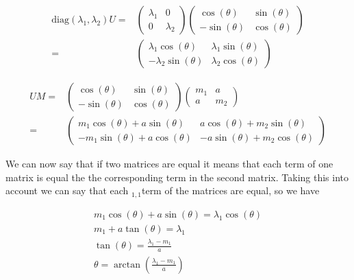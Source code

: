\documentclass[11pt,letterpaper]{article}%
\begin{document}
\begin{enumerate}[label=\Large{\textbf{\arabic*.}}]
{{\begin{enumerate}[label=\textit{\roman*.}]
\begin{equation}
\label{side1}
\begin{split}
\text{diag}(\lambda_1,\lambda_2)U =&
\begin{pmatrix}
\lambda_1 & 0\\
0 & \lambda_2
\end{pmatrix}
\begin{pmatrix}
\cos(\theta) & \sin(\theta)\\
-\sin(\theta) & \cos(\theta)
\end{pmatrix}\\
=& \begin{pmatrix}
\lambda_1\cos(\theta) & \lambda_1\sin(\theta)\\
-\lambda_2\sin(\theta) & \lambda_2\cos(\theta)
\end{pmatrix}
\end{split}
\end{equation}

\begin{equation}
\label{side2}
\begin{split}
UM =&
\begin{pmatrix}
\cos(\theta) & \sin(\theta)\\
-\sin(\theta) & \cos(\theta)
\end{pmatrix}
\begin{pmatrix}
m_1 & a\\
a & m_2
\end{pmatrix}\\
=&
\begin{pmatrix}
m_1\cos(\theta) + a\sin(\theta) & a\cos(\theta) +  m_2\sin(\theta)\\
-m_1\sin(\theta) + a\cos(\theta) & -a\sin(\theta) + m_2\cos(\theta)
\end{pmatrix}
\end{split}
\end{equation}

We can now say that if two matrices are equal it means that each term of one matrix is equal the the corresponding term in the second matrix. Taking this into account we can say that each $_{1,1}$term of the matrices are equal, so we have

\begin{equation}
\label{finalmat}
\begin{split}
m_1\cos(\theta) + a\sin(\theta) = \lambda_1\cos(\theta)\\
m_1 + a\tan(\theta) = \lambda_1\\
\tan(\theta) = \frac{\lambda_1 - m_1}{a}\\
\theta = \arctan\left( \frac{\lambda_1 - m_1}{a} \right)
\end{split}
\end{equation}


\end{enumerate}}}
\end{enumerate}
\end{document}
